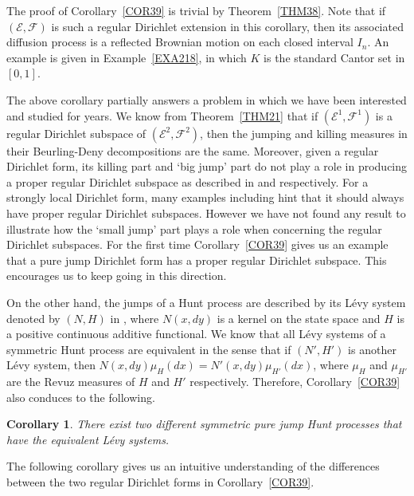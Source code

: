 \documentclass[a4paper]{amsart}
\newtheorem{corollary}[theorem]{Corollary}
\theoremstyle{definition}
\theoremstyle{remark}
\numberwithin{equation}{section}
\begin{document}
{The proof of Corollary~\ref{COR39} is trivial by Theorem~\ref{THM38}. Note that if $({{\mathcal{E}}},{{\mathcal{F}}})$ is such a regular Dirichlet extension in this corollary, then its associated diffusion process is a reflected Brownian motion on each closed interval $I_n$. An example is given in Example~\ref{EXA218}, in which $K$ is the standard Cantor set in $[0,1]$.

The above corollary partially answers a problem in which we have been interested and studied for years. We know from Theorem~\ref{THM21} that if $({{\mathcal{E}}}^1,{{\mathcal{F}}}^1)$
is a regular Dirichlet subspace of $({{\mathcal{E}}}^2,{{\mathcal{F}}}^2)$, then the jumping and killing measures in their Beurling-Deny decompositions are the same.
Moreover, given a regular Dirichlet form, its killing part and `big jump' part do not play a role in producing a proper regular Dirichlet subspace
as described in \cite[\S2.2.3]{LY15} and \cite{LY15-2} respectively. For a strongly local Dirichlet form, many examples including
\cite{FFY05, FHY10, FL15, LY15-3} hint that it should always have proper regular Dirichlet subspaces. However we have not found any result to illustrate
 how the `small jump' part plays a role when concerning the regular Dirichlet subspaces. 
For the first time Corollary~\ref{COR39} gives us an example that a pure jump Dirichlet form has a proper regular Dirichlet subspace. This encourages us to keep going in this direction.

On the other hand, the jumps of a Hunt process are described by its L\'evy system denoted by $(N, H)$ in \cite{W64}, where $N(x,dy)$ is a kernel on the state space and $H$ is a positive continuous additive functional. We know that all  L\'evy systems of a symmetric Hunt process are equivalent in the sense that if $(N', H')$ is another L\'evy system, then $N(x,dy)\mu_H(dx)=N'(x,dy)\mu_{H'}(dx)$, where $\mu_{H}$ and $\mu_{H'}$ are the Revuz measures of $H$ and $H'$ respectively. Therefore, Corollary~\ref{COR39} also conduces to the following. }

\begin{corollary}
There exist two different symmetric pure jump Hunt processes that have the equivalent L\'evy systems.
\end{corollary}

The following corollary gives us an intuitive understanding of the differences between the two regular Dirichlet forms in Corollary~\ref{COR39}.
\end{document}
